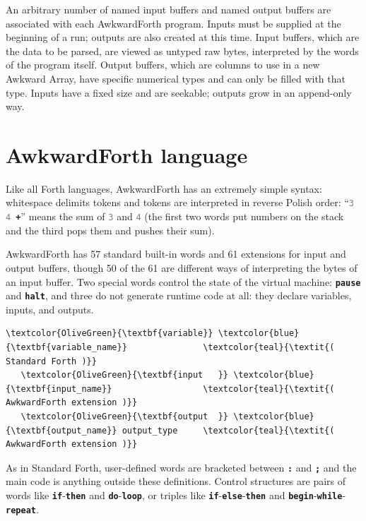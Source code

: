 \documentclass{webofc}
\begin{document}
An arbitrary number of named input buffers and named output buffers are associated with each AwkwardForth program. Inputs must be supplied at the beginning of a run; outputs are also created at this time. Input buffers, which are the data to be parsed, are viewed as untyped raw bytes, interpreted by the words of the program itself. Output buffers, which are columns to use in a new Awkward Array, have specific numerical types and can only be filled with that type. Inputs have a fixed size and are seekable; outputs grow in an append-only way.

\section{AwkwardForth language}

Like all Forth languages, AwkwardForth has an extremely simple syntax: whitespace delimits tokens and tokens are interpreted in reverse Polish order: ``{\tt\textcolor{gray}{3} \textcolor{gray}{4} \textcolor{OliveGreen}{\textbf{+}}}'' means the sum of \textcolor{gray}{\tt 3} and \textcolor{gray}{\tt 4} (the first two words put numbers on the stack and the third pops them and pushes their sum).

AwkwardForth has 57 standard built-in words and 61 extensions for input and output buffers, though 50 of the 61 are different ways of interpreting the bytes of an input buffer. Two special words control the state of the virtual machine: \textcolor{OliveGreen}{\tt\textbf{pause}} and \textcolor{OliveGreen}{\tt\textbf{halt}}, and three do not generate runtime code at all: they declare variables, inputs, and outputs.

\small
\begin{Verbatim}[commandchars=\\\{\}]
   \textcolor{OliveGreen}{\textbf{variable}} \textcolor{blue}{\textbf{variable_name}}               \textcolor{teal}{\textit{( Standard Forth )}}
   \textcolor{OliveGreen}{\textbf{input   }} \textcolor{blue}{\textbf{input_name}}                  \textcolor{teal}{\textit{( AwkwardForth extension )}}
   \textcolor{OliveGreen}{\textbf{output  }} \textcolor{blue}{\textbf{output_name}} output_type     \textcolor{teal}{\textit{( AwkwardForth extension )}}
\end{Verbatim}
\normalsize

As in Standard Forth, user-defined words are bracketed between \textcolor{OliveGreen}{\tt\textbf{:}} and \textcolor{OliveGreen}{\tt\textbf{;}} and the main code is anything outside these definitions. Control structures are pairs of words like \textcolor{OliveGreen}{\tt\textbf{if}}-\textcolor{OliveGreen}{\tt\textbf{then}} and \textcolor{OliveGreen}{\tt\textbf{do}}-\textcolor{OliveGreen}{\tt\textbf{loop}}, or triples like \textcolor{OliveGreen}{\tt\textbf{if}}-\textcolor{OliveGreen}{\tt\textbf{else}}-\textcolor{OliveGreen}{\tt\textbf{then}} and \textcolor{OliveGreen}{\tt\textbf{begin}}-\textcolor{OliveGreen}{\tt\textbf{while}}-\textcolor{OliveGreen}{\tt\textbf{repeat}}.
\end{document}
